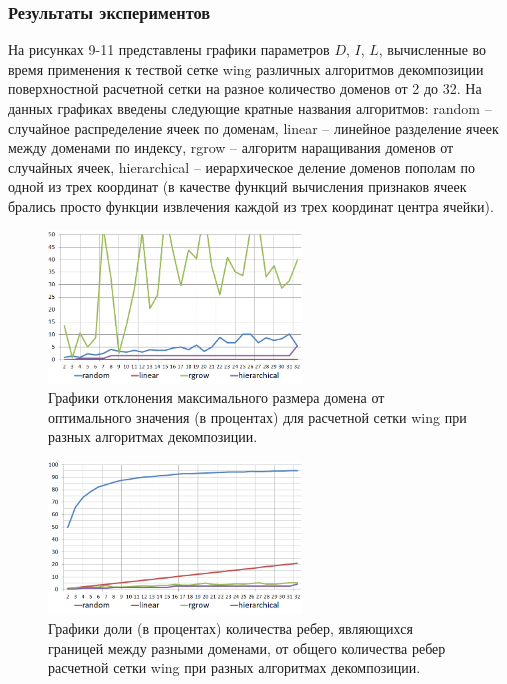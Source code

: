 \subsubsection{Результаты экспериментов}

На рисунках 9-11 представлены графики параметров $D$, $I$, $L$, вычисленные во время применения к тествой сетке wing различных алгоритмов декомпозиции поверхностной расчетной сетки на разное количество доменов от 2 до 32.
На данных графиках введены следующие кратные названия алгоритмов: random -- случайное распределение ячеек по доменам, linear -- линейное разделение ячеек между доменами по индексу, rgrow -- алгоритм наращивания доменов от случайных ячеек, hierarchical -- иерархическое деление доменов пополам по одной из трех координат (в качестве функций вычисления признаков ячеек брались просто функции извлечения каждой из трех координат центра ячейки).

\begin{figure}[ht]
	\centering
		\includegraphics[width=0.6\textwidth]{./pics/text_2_decompsurf/wing_50_blocks_dev.png}
	\caption{Графики отклонения максимального размера домена от оптимального значения (в процентах) для расчетной сетки wing при разных алгоритмах декомпозиции.}
	\label{fig:text_2_decompsurf_wing_50_blocks_dev}
\end{figure}

\begin{figure}[ht]
	\centering
		\includegraphics[width=0.6\textwidth]{./pics/text_2_decompsurf/wing_50_inter_edges.png}
	\caption{Графики доли (в процентах) количества ребер, являющихся границей между разными доменами, от общего количества ребер расчетной сетки wing при разных алгоритмах декомпозиции.}
	\label{fig:text_2_decompsurf_wing_50_inter_edges}
\end{figure}

